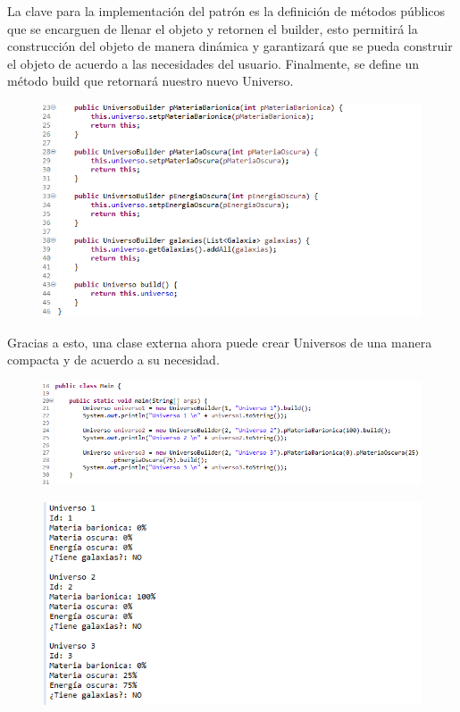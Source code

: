  La clave para la implementación del patrón es la definición de métodos públicos que se encarguen de llenar el objeto y retornen el builder, esto permitirá la construcción del objeto de manera dinámica y garantizará que se pueda construir el objeto de acuerdo a las necesidades del usuario. Finalmente, se define un método build que retornará nuestro nuevo Universo.
 
 \begin{figure}[H]
	\includegraphics{images/creational/builder/builderExample5.png}
\end{figure}
 
 Gracias a esto, una clase externa ahora puede crear Universos de una manera compacta y de acuerdo a su necesidad.
 
 \begin{figure}[H]
	\includegraphics{images/creational/builder/builderExample6.png}
\end{figure}
 
 \begin{figure}[H]
	\includegraphics{images/creational/builder/builderExample7.png}
\end{figure}

